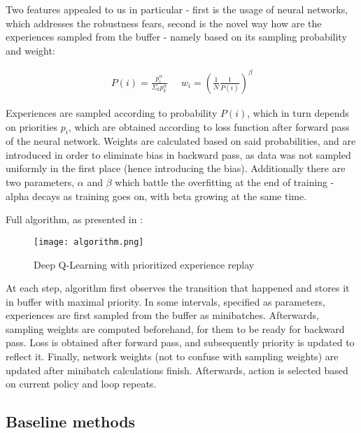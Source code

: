 \documentclass[a4paper,11pt]{article}
\theoremstyle{definition}
\begin{document}
Two features appealed to us in particular - first is the usage of neural networks, which addresses the robustness fears, second is the novel way how are the experiences sampled from the buffer - namely based on its sampling probability and weight:

\begin{align*}
    P(i) = \frac{p_i^{\alpha}}{\Sigma_k p_k^{\alpha}} \;\;\;\;\;
    w_i = (\frac{1}{N} \frac{1}{P(i)})^{\beta}
\end{align*}

Experiences are sampled according to probability $P(i)$, which in turn depends on priorities $p_i$, which are obtained according to loss function after forward pass of the neural network. Weights are calculated based on said probabilities, and are introduced in order to eliminate bias in backward pass, as data was not sampled uniformly in the first place (hence introducing the bias). Additionally there are two parameters, $\alpha$ and $\beta$ which battle the overfitting at the end of training - alpha decays as training goes on, with beta growing at the same time. 

Full algorithm, as presented in \cite{schaul_2016}:

\begin{figure}[h]
    \centering
    \texttt{[image: algorithm.png]}
    \caption{Deep Q-Learning with prioritized experience replay}
    \label{fig:my_label}
\end{figure}

At each step, algorithm first observes the transition that happened and stores it in buffer with maximal priority. In some intervals, specified as parameters, experiences are first sampled from the buffer as minibatches. Afterwards, sampling weights are computed beforehand, for them to be ready for backward pass. Loss is obtained after forward pass, and subsequently priority is updated to reflect it. Finally, network weights (not to confuse with sampling weights) are updated after minibatch calculations finish. Afterwards, action is selected based on current policy and loop repeats. 

\subsection{Baseline methods}
\end{document}
